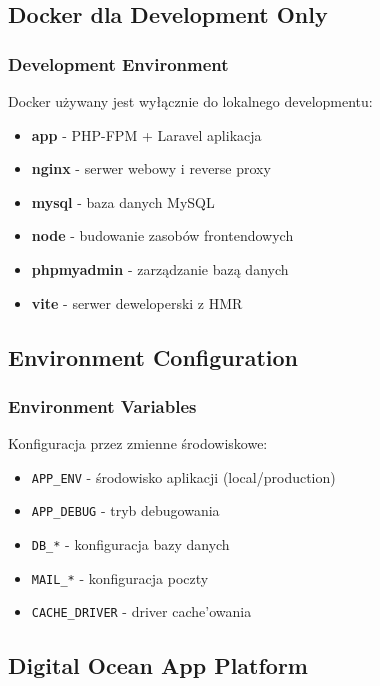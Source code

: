     \subsection{Docker dla Development Only}

    \subsubsection{Development Environment}
    Docker używany jest wyłącznie do lokalnego developmentu:

    \begin{itemize}
        \item \textbf{app} - PHP-FPM + Laravel aplikacja
        \item \textbf{nginx} - serwer webowy i reverse proxy
        \item \textbf{mysql} - baza danych MySQL
        \item \textbf{node} - budowanie zasobów frontendowych
        \item \textbf{phpmyadmin} - zarządzanie bazą danych
        \item \textbf{vite} - serwer deweloperski z HMR
    \end{itemize}

    \subsection{Environment Configuration}

    \subsubsection{Environment Variables}
    Konfiguracja przez zmienne środowiskowe:

    \begin{itemize}
        \item \texttt{APP\_ENV} - środowisko aplikacji (local/production)
        \item \texttt{APP\_DEBUG} - tryb debugowania
        \item \texttt{DB\_*} - konfiguracja bazy danych
        \item \texttt{MAIL\_*} - konfiguracja poczty
        \item \texttt{CACHE\_DRIVER} - driver cache'owania
    \end{itemize}

    \subsection{Digital Ocean App Platform}

